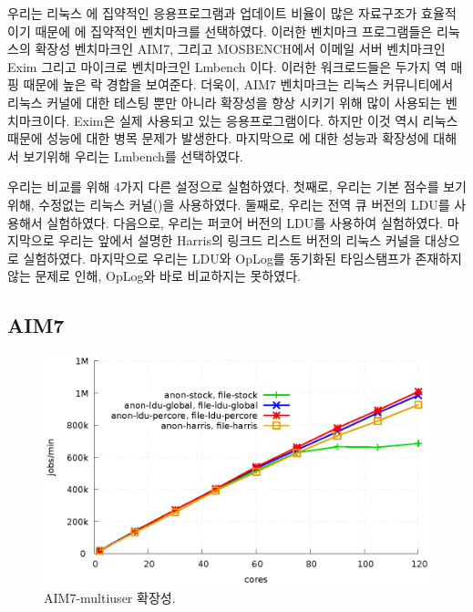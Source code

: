 
우리는 리눅스 에 집약적인 응용프로그램과 업데이트 비율이 많은 자료구조가 
효율적이기 때문에 에 집약적인 벤치마크를 선택하였다. 
이러한 벤치마크 프로그램들은 리눅스의 확장성 벤치마크인 AIM7, 그리고 MOSBENCH에서 
이메일 서버 벤치마크인 Exim 그리고 마이크로 벤치마크인 Lmbench 이다.
이러한 워크로드들은 두가지 역 매핑 때문에 높은 락 경합을 보여준다. 
더욱이, AIM7 벤치마크는 리눅스 커뮤니티에서 리눅스 커널에 대한 테스팅 뿐만 아니라 확장성을 향상 
시키기 위해 많이 사용되는 벤치마크이다.
Exim은 실제 사용되고 있는 응용프로그램이다. 
하지만 이것 역시 리눅스  때문에 성능에 대한 병목 문제가 발생한다.
마지막으로 에 대한 성능과 확장성에 대해서 보기위해 우리는 Lmbench를 선택하였다. 

우리는 비교를 위해 4가지 다른 설정으로 실험하였다. 
첫째로, 우리는 기본 점수를 보기 위해, 수정없는 리눅스 커널()을 사용하였다.
둘째로, 우리는 전역 큐 버전의 LDU를 사용해서 실험하였다.  
다음으로, 우리는 퍼코어 버전의 LDU를 사용하여 실험하였다. 
마지막으로 우리는 앞에서 설명한 Harris의  링크드 리스트 버전의 리눅스 커널을 대상으로 
실험하였다.  
마지막으로 우리는 LDU와 OpLog를 동기화된 타임스탬프가 존재하지 않는 문제로 인해,
OpLog와 바로 비교하지는 못하였다.

\subsection{AIM7}

\begin{figure}[tb]
  \begin{center}
    \includegraphics[scale=1]{graph/aim7.eps}
  \end{center}
  \caption{AIM7-multiuser 확장성.}
  \label{fig:aim7}
\end{figure}

